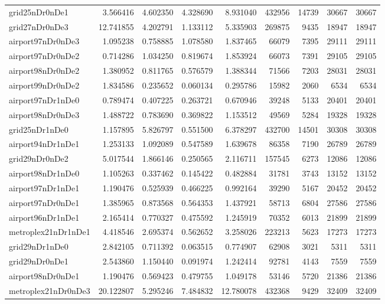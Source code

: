 \begin{longtable}{|l|r|r|r|r|r|r|r|r|}
grid25nDr0nDe1 & 3.566416 & 4.602350 & 4.328690 & 8.931040 & 432956 & 14739 & 30667 & 30667 \\
grid27nDr0nDe3 & 12.741855 & 4.202791 & 1.133112 & 5.335903 & 269875 & 9435 & 18947 & 18947 \\
airport97nDr0nDe3 & 1.095238 & 0.758885 & 1.078580 & 1.837465 & 66079 & 7395 & 29111 & 29111 \\
airport97nDr0nDe2 & 0.714286 & 1.034250 & 0.819674 & 1.853924 & 66073 & 7391 & 29105 & 29105 \\
airport98nDr0nDe2 & 1.380952 & 0.811765 & 0.576579 & 1.388344 & 71566 & 7203 & 28031 & 28031 \\
airport99nDr0nDe2 & 1.834586 & 0.235652 & 0.060134 & 0.295786 & 15982 & 2060 & 6534 & 6534 \\
airport97nDr1nDe0 & 0.789474 & 0.407225 & 0.263721 & 0.670946 & 39248 & 5133 & 20401 & 20401 \\
airport98nDr0nDe3 & 1.488722 & 0.783690 & 0.369822 & 1.153512 & 49569 & 5284 & 19328 & 19328 \\
grid25nDr1nDe0 & 1.157895 & 5.826797 & 0.551500 & 6.378297 & 432700 & 14501 & 30308 & 30308 \\
airport94nDr1nDe1 & 1.253133 & 1.092089 & 0.547589 & 1.639678 & 86358 & 7190 & 26789 & 26789 \\
grid29nDr0nDe2 & 5.017544 & 1.866146 & 0.250565 & 2.116711 & 157545 & 6273 & 12086 & 12086 \\
airport98nDr1nDe0 & 1.105263 & 0.337462 & 0.145422 & 0.482884 & 31781 & 3743 & 13152 & 13152 \\
airport97nDr1nDe1 & 1.190476 & 0.525939 & 0.466225 & 0.992164 & 39290 & 5167 & 20452 & 20452 \\
airport97nDr0nDe1 & 1.385965 & 0.873568 & 0.564353 & 1.437921 & 58713 & 6804 & 27586 & 27586 \\
airport96nDr1nDe1 & 2.165414 & 0.770327 & 0.475592 & 1.245919 & 70352 & 6013 & 21899 & 21899 \\
metroplex21nDr1nDe1 & 4.418546 & 2.695374 & 0.562652 & 3.258026 & 223213 & 5623 & 17273 & 17273 \\
grid29nDr1nDe0 & 2.842105 & 0.711392 & 0.063515 & 0.774907 & 62908 & 3021 & 5311 & 5311 \\
grid29nDr0nDe1 & 2.543860 & 1.150440 & 0.091974 & 1.242414 & 92781 & 4143 & 7559 & 7559 \\
airport98nDr0nDe1 & 1.190476 & 0.569423 & 0.479755 & 1.049178 & 53146 & 5720 & 21386 & 21386 \\
metroplex21nDr0nDe3 & 20.122807 & 5.295246 & 7.484832 & 12.780078 & 432368 & 9429 & 32409 & 32409 \\

\end{longtable}
